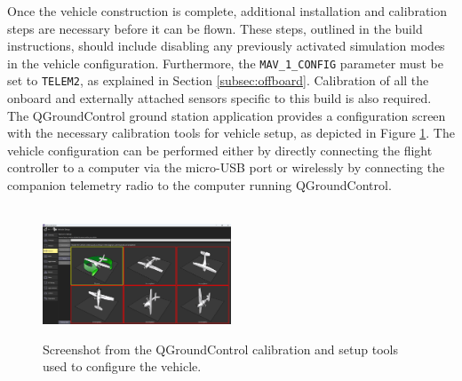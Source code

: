 Once the vehicle construction is complete, additional installation and calibration steps are necessary before it can be flown. These steps, outlined in the build instructions, should include disabling any previously activated simulation modes in the vehicle configuration. Furthermore, the \texttt{MAV\_1\_CONFIG} parameter must be set to \texttt{TELEM2}, as explained in Section \ref{subsec:offboard}. Calibration of all the onboard and externally attached sensors specific to this build is also required. The QGroundControl ground station application provides a configuration screen with the necessary calibration tools for vehicle setup, as depicted in Figure \ref{fig:qgc-config}. The vehicle configuration can be performed either by directly connecting the flight controller to a computer via the micro-USB port or wirelessly by connecting the companion telemetry radio to the computer running QGroundControl.


\begin{figure}[H]
  \centering
  \\
  \includegraphics[width=0.5\textwidth, keepaspectratio]{img/qgc-config-2.png}
  \caption{Screenshot from the QGroundControl calibration and setup tools used to configure the vehicle.}\label{fig:qgc-config}
\end{figure}


